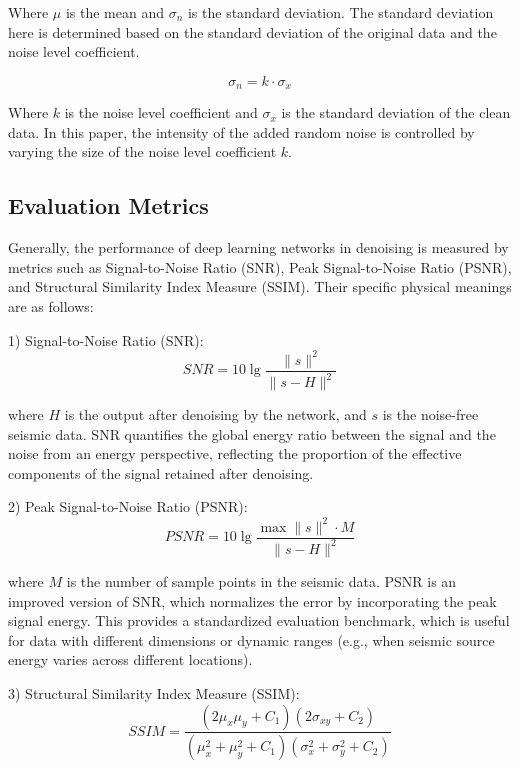 \documentclass[preprint,12pt]{elsarticle}
\begin{document}
Where $\mu$ is the mean and $\sigma_n$ is the standard deviation. The standard deviation here is determined based on the standard deviation of the original data and the noise level coefficient.

\begin{equation}
\sigma_{n} = k \cdot \sigma_{x}
\end{equation}

Where $k$ is the noise level coefficient and $\sigma_x$ is the standard deviation of the clean data. In this paper, the intensity of the added random noise is controlled by varying the size of the noise level coefficient $k$.

\subsection{Evaluation Metrics}
Generally, the performance of deep learning networks in denoising is measured by metrics such as Signal-to-Noise Ratio (SNR), Peak Signal-to-Noise Ratio (PSNR), and Structural Similarity Index Measure (SSIM). Their specific physical meanings are as follows:

1) Signal-to-Noise Ratio (SNR):
\begin{equation}
SNR = 10 \lg \frac{\|s\|^{2}}{\|s - H\|^{2}} \tag{9}
\end{equation}

where $H$ is the output after denoising by the network, and $s$ is the noise-free seismic data. SNR quantifies the global energy ratio between the signal and the noise from an energy perspective, reflecting the proportion of the effective components of the signal retained after denoising.

2) Peak Signal-to-Noise Ratio (PSNR):
\begin{equation}
PSNR = 10 \lg \frac{\max\|s\|^{2} \cdot M}{\|s - H\|^{2}} \tag{10}
\end{equation}

where $M$ is the number of sample points in the seismic data. PSNR is an improved version of SNR, which normalizes the error by incorporating the peak signal energy. This provides a standardized evaluation benchmark, which is useful for data with different dimensions or dynamic ranges (e.g., when seismic source energy varies across different locations).

3) Structural Similarity Index Measure (SSIM):
\begin{equation}
SSIM = \frac{(2\mu_{x}\mu_{y} + C_{1})(2\sigma_{xy} + C_{2})}{(\mu_{x}^{2} + \mu_{y}^{2} + C_{1})(\sigma_{x}^{2} + \sigma_{y}^{2} + C_{2})} \tag{11}
\end{equation}
\end{document}
